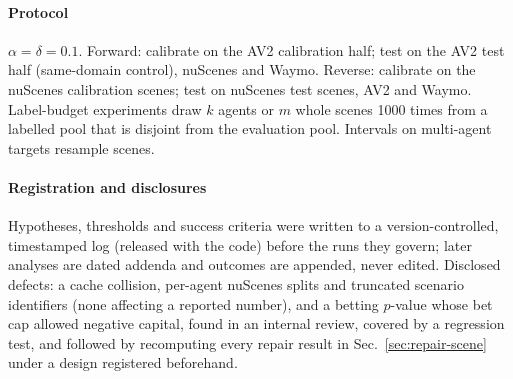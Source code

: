 \paragraph{Protocol} $\alpha=\delta=0.1$. Forward: calibrate on the AV2 calibration half; test on the AV2 test half
(same-domain control), nuScenes and Waymo. Reverse: calibrate on the nuScenes calibration scenes; test on nuScenes test
scenes, AV2 and Waymo. Label-budget experiments draw $k$ agents or $m$ whole scenes 1000 times from a labelled pool that
is disjoint from the evaluation pool. Intervals on multi-agent targets resample scenes.
\paragraph{Registration and disclosures} Hypotheses, thresholds and success criteria were written to a version-controlled,
timestamped log (released with the code) before the runs they govern; later analyses are dated addenda and outcomes are
appended, never edited. Disclosed defects: a cache collision, per-agent nuScenes splits and truncated scenario
identifiers (none affecting a reported number), and a betting $p$-value whose bet cap allowed negative capital, found in
an internal review, covered by a regression test, and followed by recomputing every repair result in
Sec.~\ref{sec:repair-scene} under a design registered beforehand.
